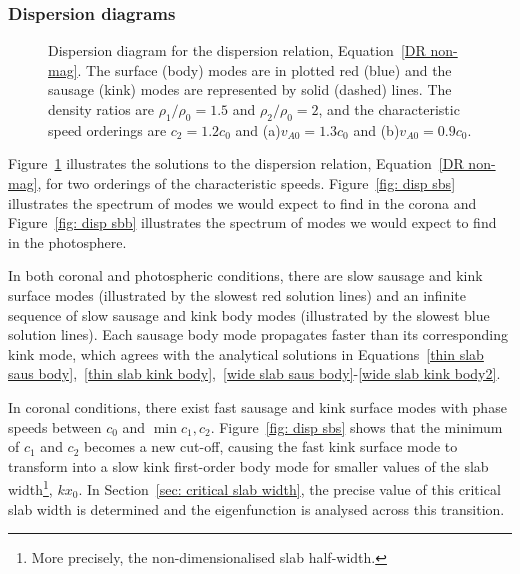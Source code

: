 \documentclass[12pt,draft]{../style-files/ociamthesis}
\begin{document}
\subsubsection{Dispersion diagrams} \label{sec: disp diagrams}

\begin{figure}[]
	\centering
	\caption{Dispersion diagram for the dispersion relation, Equation~\eqref{DR non-mag}. The surface (body) modes are in plotted red (blue) and the sausage (kink) modes are represented by solid (dashed) lines. The density ratios are $\rho_1/\rho_0 = 1.5$ and $\rho_2/\rho_0 = 2$, and the characteristic speed orderings are $c_2 = 1.2c_0$ and (a)$v_{A0} = 1.3c_0$ and (b)$v_{A0} = 0.9c_0$.}
	\label{fig: disp}
\end{figure}

Figure~\ref{fig: disp} illustrates the solutions to the dispersion relation, Equation~\eqref{DR non-mag}, for two orderings of the characteristic speeds. Figure~\ref{fig: disp sbs} illustrates the spectrum of modes we would expect to find in the corona and Figure~\ref{fig: disp sbb} illustrates the spectrum of modes we would expect to find in the photosphere.

In both coronal and photospheric conditions, there are slow sausage and kink surface modes (illustrated by the slowest red solution lines) and an infinite sequence of slow sausage and kink body modes (illustrated by the slowest blue solution lines). Each sausage body mode propagates faster than its corresponding kink mode, which agrees with the analytical solutions in Equations~\eqref{thin slab saus body},~\eqref{thin slab kink body},~\eqref{wide slab saus body}-\eqref{wide slab kink body2}.

In coronal conditions, there exist fast sausage and kink surface modes with phase speeds between $c_0$ and $\min{c_1, c_2}$. Figure~\ref{fig: disp sbs} shows that the minimum of $c_1$ and $c_2$ becomes a new cut-off, causing the fast kink surface mode to transform into a slow kink first-order body mode for smaller values of the slab width\footnote{More precisely, the non-dimensionalised slab half-width.}, $kx_0$. In Section~\ref{sec: critical slab width}, the precise value of this critical slab width is determined and the eigenfunction is analysed across this transition.
\end{document}

